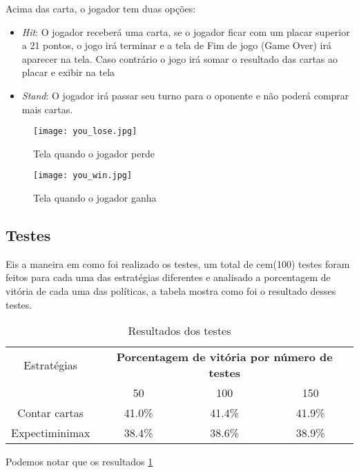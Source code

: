 Acima das carta, o jogador tem duas opções:
\begin{itemize}
    \item \emph{Hit}: O jogador receberá uma carta, se o jogador ficar com um 
    placar superior a 21 pontos, o jogo irá terminar e a tela de Fim de jogo (Game Over)
    irá aparecer na tela. Caso contrário o jogo irá somar o resultado das cartas ao placar 
    e exibir na tela 
    \item \emph{Stand}: O jogador irá passar seu turno para o oponente e não poderá 
    comprar mais cartas.
\end{itemize}

\begin{figure}[ht] 
    \centering
    \texttt{[image: you\_lose.jpg]}
    \caption{Tela quando o jogador perde}
    \label{fig:you_lose}
\end{figure}

\begin{figure}[ht] 
    \centering
    \texttt{[image: you\_win.jpg]}
    \caption{Tela quando o jogador ganha}
    \label{fig:you_win}
\end{figure}

\subsection{Testes}

Eis a maneira em como foi realizado os testes, um total de cem(100) testes 
foram feitos para cada uma das estratégias diferentes e analisado a
porcentagem de vitória de cada uma das políticas, a tabela mostra como foi 
o resultado desses testes.

\begin{table}[htbp]
    \centering
    \caption{Resultados dos testes}
    \begin{tabular}{|c | c | c | c|} 
        \hline
        Estratégias & \multicolumn{3}{|c|}{\textbf{Porcentagem de vitória por número de testes}} \\ 
        \cline{2-4} 
          & 50 & 100 & 150 \\ 
        \hline
        Contar cartas  & 41.0\% & 41.4\% & 41.9\% \\
        \hline
        Expectiminimax & 38.4\% & 38.6\% & 38.9\% \\
        \hline
    \end{tabular}
    \label{tab:results}
\end{table}

Podemos notar que os resultados  \ref{tab:results}

